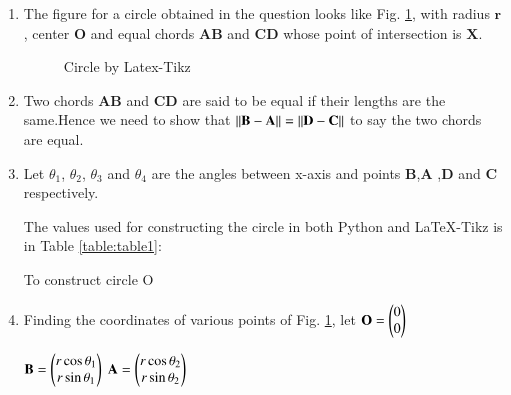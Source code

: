 \renewcommand{\vec}[1]{\mathbf{#1}}
\renewcommand{\theequation}{\theenumi}
\begin{enumerate}[label=\thesection.\arabic*.,ref=\thesection.\theenumi]

\item
The figure for a circle obtained in the question looks like Fig. \ref{fig:stepthreetex}, with radius $\vec{r}$, center $\vec{O}$ and equal chords $\vec{AB}$ and $\vec{CD}$ whose point of intersection is $\vec{X}$.  
\begin{figure}[!ht]
\centering
\resizebox{\columnwidth}{!}{}
\caption{Circle by Latex-Tikz}
\label{fig:stepthreetex}	
\end{figure}

\item 
Two chords $\vec{AB}$ and $\vec{CD}$ are said to be equal if their lengths are the same.Hence we need to show that $\norm{\vec{B}-\vec{A}} = \norm{\vec{D}-\vec{C}}$ to say the two chords are equal.
\item
Let $\theta_1$, $\theta_2$, $\theta_3$ and $\theta_4$ are the angles between x-axis and points $\vec{B}$,$\vec{A}$ ,$\vec{D}$  and $\vec{C}$ respectively.

The values used for constructing the circle in both Python and \LaTeX{}-Tikz is in Table \ref{table:table1}:\\
\begin{table}[ht]
    \begin{center}
    	
  \caption{To construct circle O}
   \label{table:table1}
   \end{center}	
\end{table}


\item Finding the coordinates of various points of Fig. \ref{fig:stepthreetex}, let 
\quad $ \vec{O}= \myvec{0\\0}$

  \quad $ \vec{B}= \myvec{r\cos{\theta _1}\\r\sin{\theta _1}}$
  \quad $\vec{A}=\myvec{r\cos{\theta _2}\\r\sin{\theta _2}}$


\end{enumerate}
